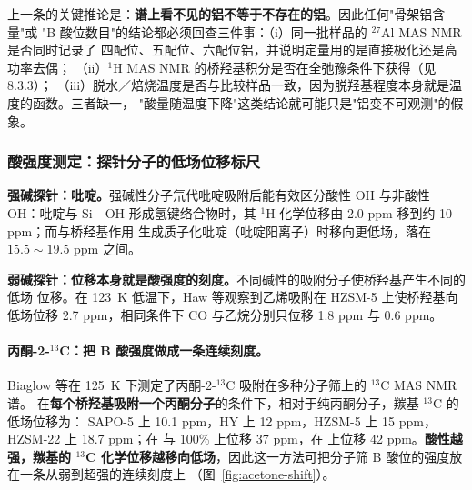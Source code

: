 \begin{crosscheck}
上一条的关键推论是：\textbf{谱上看不见的铝不等于不存在的铝}。因此任何"骨架铝含量"或
"B 酸位数目"的结论都必须回查三件事：（i）同一批样品的 $^{27}$Al MAS NMR 是否同时记录了
四配位、五配位、六配位铝，并说明定量用的是直接极化还是高功率去偶；
（ii）$^{1}$H MAS NMR 的桥羟基积分是否在全弛豫条件下获得（见 8.3.3）；
（iii）脱水／焙烧温度是否与比较样品一致，因为脱羟基程度本身就是温度的函数。三者缺一，
"酸量随温度下降"这类结论就可能只是"铝变不可观测"的假象。
\end{crosscheck}

\subsubsection{酸强度测定：探针分子的低场位移标尺}
\label{sec:acid-strength}

\textbf{强碱探针：吡啶。}强碱性分子氘代吡啶吸附后能有效区分酸性 OH 与非酸性 OH：吡啶与
Si—OH 形成氢键络合物时，其 $^{1}$H 化学位移由 2.0 ppm 移到约 10 ppm；而与桥羟基作用
生成质子化吡啶（吡啶阳离子）时移向更低场，落在 $15.5\sim19.5$ ppm 之间。

\textbf{弱碱探针：位移本身就是酸强度的刻度。}不同碱性的吸附分子使桥羟基产生不同的低场
位移。在 \qty{123}{K} 低温下，Haw 等观察到乙烯吸附在 HZSM-5 上使桥羟基向低场位移
2.7 ppm，相同条件下 CO 与乙烷分别只位移 1.8 ppm 与 0.6 ppm。

\paragraph{丙酮-2-$^{13}$C：把 B 酸强度做成一条连续刻度。}
Biaglow 等在 \qty{125}{K} 下测定了丙酮-2-$^{13}$C 吸附在多种分子筛上的 $^{13}$C MAS NMR 谱。
在\textbf{每个桥羟基吸附一个丙酮分子}的条件下，相对于纯丙酮分子，羰基 $^{13}$C 的低场位移为：
SAPO-5 上 10.1 ppm，HY 上 12 ppm，HZSM-5 上 15 ppm，HZSM-22 上 18.7 ppm；在  与
100\%  上位移 37 ppm，在  上位移 42 ppm。\textbf{酸性越强，羰基的 $^{13}$C
化学位移越移向低场}，因此这一方法可把分子筛 B 酸位的强度放在一条从弱到超强的连续刻度上
（图~\ref{fig:acetone-shift}）。

